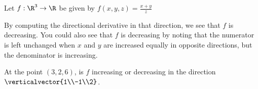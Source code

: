 \documentclass{ximera}
\begin{document}
	\begin{question}
		Let $f:\R^3 \to \R$ be given by $f(x,y,z)=\frac{x+y}{z}$
		\begin{solution}
			\begin{hint}
				By computing the directional derivative in that direction, we see that $f$ is decreasing. 
				You could also see that $f$ is decreasing by noting that the numerator is left unchanged when $x$ and $y$ are increased
				equally in opposite directions, but the denominator is increasing.
			\end{hint}
			At the point $(3,2,6)$, is $f$ increasing or decreasing in the direction $\verticalvector{1\\-1\\2}$.
			\begin{multiple-choice}
			\end{multiple-choice}
		\end{solution}
	\end{question}
	
\end{document}
